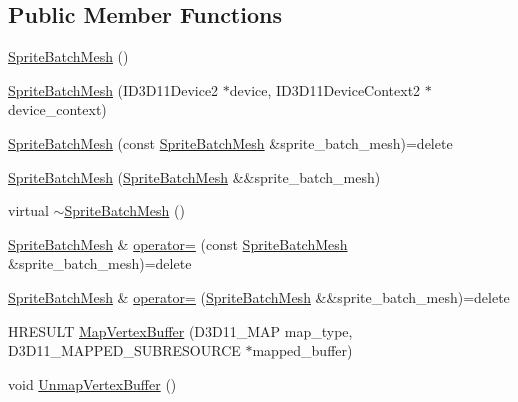 \subsection*{Public Member Functions}
\begin{DoxyCompactItemize}
\item 
\hyperlink{classmage_1_1_sprite_batch_mesh_ae5b2219aa3d5bbfb216036dad9c12e5d}{Sprite\+Batch\+Mesh} ()
\item 
\hyperlink{classmage_1_1_sprite_batch_mesh_a7664804b05d08b7126c3efedee5c2588}{Sprite\+Batch\+Mesh} (I\+D3\+D11\+Device2 $\ast$device, I\+D3\+D11\+Device\+Context2 $\ast$device\+\_\+context)
\item 
\hyperlink{classmage_1_1_sprite_batch_mesh_af86adf72834bd4a8b5b55af3e91bd339}{Sprite\+Batch\+Mesh} (const \hyperlink{classmage_1_1_sprite_batch_mesh}{Sprite\+Batch\+Mesh} \&sprite\+\_\+batch\+\_\+mesh)=delete
\item 
\hyperlink{classmage_1_1_sprite_batch_mesh_ae577b9b1f38ab5748c35675135da1e3e}{Sprite\+Batch\+Mesh} (\hyperlink{classmage_1_1_sprite_batch_mesh}{Sprite\+Batch\+Mesh} \&\&sprite\+\_\+batch\+\_\+mesh)
\item 
virtual \hyperlink{classmage_1_1_sprite_batch_mesh_a4f9ad5d0d58722499b9e7ddfac3312c9}{$\sim$\+Sprite\+Batch\+Mesh} ()
\item 
\hyperlink{classmage_1_1_sprite_batch_mesh}{Sprite\+Batch\+Mesh} \& \hyperlink{classmage_1_1_sprite_batch_mesh_ac6b9c2c79286f736d9a91a79cfa70044}{operator=} (const \hyperlink{classmage_1_1_sprite_batch_mesh}{Sprite\+Batch\+Mesh} \&sprite\+\_\+batch\+\_\+mesh)=delete
\item 
\hyperlink{classmage_1_1_sprite_batch_mesh}{Sprite\+Batch\+Mesh} \& \hyperlink{classmage_1_1_sprite_batch_mesh_a678700348ef43c46ed90d87d78c498de}{operator=} (\hyperlink{classmage_1_1_sprite_batch_mesh}{Sprite\+Batch\+Mesh} \&\&sprite\+\_\+batch\+\_\+mesh)=delete
\item 
H\+R\+E\+S\+U\+LT \hyperlink{classmage_1_1_sprite_batch_mesh_ab790dbbd3cb685c1f14d7ca1e9ed639b}{Map\+Vertex\+Buffer} (D3\+D11\+\_\+\+M\+AP map\+\_\+type, D3\+D11\+\_\+\+M\+A\+P\+P\+E\+D\+\_\+\+S\+U\+B\+R\+E\+S\+O\+U\+R\+CE $\ast$mapped\+\_\+buffer)
\item 
void \hyperlink{classmage_1_1_sprite_batch_mesh_a48ed983397a37a5874101b49c040b78c}{Unmap\+Vertex\+Buffer} ()
\end{DoxyCompactItemize}
